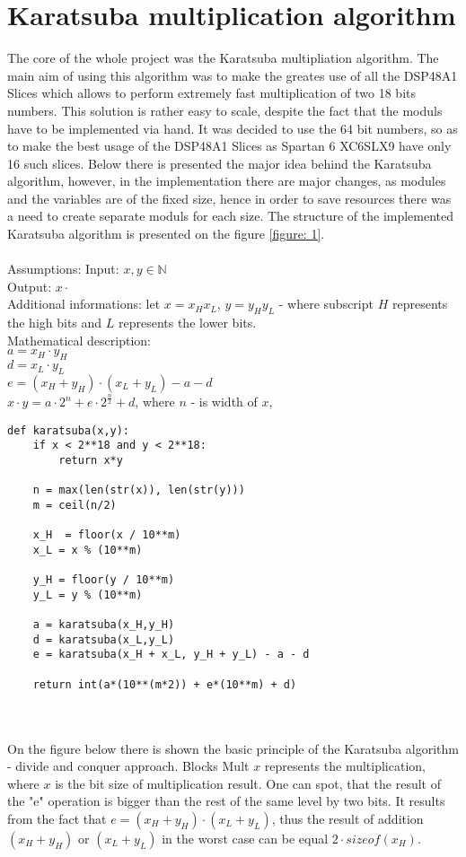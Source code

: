 \documentclass{report}
\begin{document}
\section{Karatsuba multiplication algorithm}
The core of the whole project was the Karatsuba multipliation algorithm. The main aim of using this algorithm was to make the greates use of all the DSP48A1 Slices which allows to perform extremely fast multiplication of two 18 bits numbers. This solution is rather easy to scale, despite the fact that the moduls have to be implemented via hand. It was decided to use the 64 bit numbers, so as to make the best usage of the DSP48A1 Slices as Spartan 6 XC6SLX9 have only 16 such slices. Below there is presented the major idea behind the Karatsuba algorithm, however, in the implementation there are major changes, as modules and the variables are of the fixed size, hence in order to save resources there was a need to create separate moduls for each size. The structure of the implemented Karatsuba algorithm is presented on the figure \ref{figure: 1}.\\ \\
Assumptions:
Input: $x, y \in\mathbb{N}$\\
Output: $x \cdot $\\
Additional informations: let $x = x_Hx_L$, $y = y_Hy_L$ - where subscript $H$ represents the high bits and $L$ represents the lower bits.\\
Mathematical description:\\
$a = x_H \cdot y_H$\\
$d = x_L \cdot y_L$\\
$e = (x_H + y_H) \cdot (x_L + y_L) - a - d$\\
$x \cdot y = a\cdot2^n + e\cdot2^{\frac{n}{2}} + d$, where $n$ - is width of $x$,
\begin{lstlisting}[caption=Karatsuba algorithm]
def karatsuba(x,y):
    if x < 2**18 and y < 2**18:
        return x*y

    n = max(len(str(x)), len(str(y)))
    m = ceil(n/2) 

    x_H  = floor(x / 10**m)
    x_L = x % (10**m)

    y_H = floor(y / 10**m)
    y_L = y % (10**m)

    a = karatsuba(x_H,y_H)
    d = karatsuba(x_L,y_L)
    e = karatsuba(x_H + x_L, y_H + y_L) - a - d

    return int(a*(10**(m*2)) + e*(10**m) + d)
\end{lstlisting}  
\\ \\On the figure below there is shown the basic principle of the Karatsuba algorithm - divide and conquer approach. Blocks Mult $x$ represents the multiplication, where $x$ is the bit size of multiplication result. One can spot, that the result of the "e" operation is bigger than the rest of the same level by two bits. It results from the fact that $e = (x_H + y_H) \cdot (x_L + y_L)$, thus the result of addition $(x_H + y_H)$ or $(x_L + y_L)$ in the worst case can be equal $2 \cdot sizeof(x_H)$.
\end{document}
